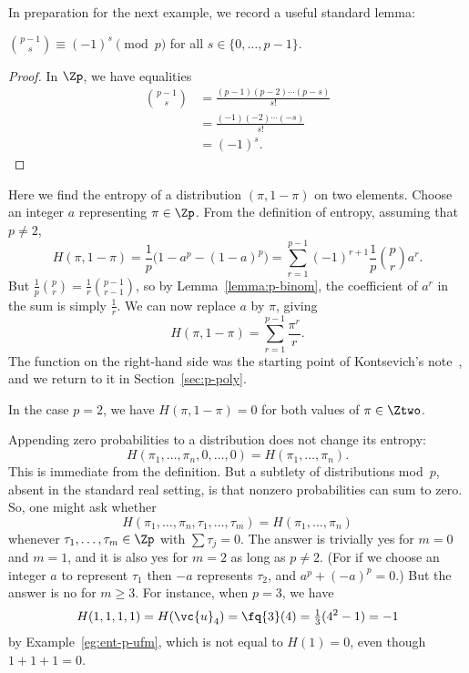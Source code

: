 In preparation for the next example, we record a useful standard lemma:

\begin{lemma}
$\binom{p - 1}{s} \equiv (-1)^s \pmod{p}$ for all $s \in \{0, \ldots, p -
  1\}$. 
\end{lemma}

\begin{proof}
In $\Zp$, we have equalities
% 
\begin{align*}
\binom{p - 1}{s}        &
=
\frac{(p - 1)(p - 2) \cdots (p - s)}{s!}    \\
&
=
\frac{(-1)(-2) \cdots (-s)}{s!}   \\
&
=
(-1)^s.
\end{align*}
% 
\end{proof}

\begin{example}
 Here we find the entropy of a distribution $(\pi, 1 - \pi)$
on two elements.  Choose an integer $a$ representing $\pi \in \Zp$.  From the
definition of entropy, assuming that $p \neq 2$,
\[
H(\pi, 1 - \pi)
=
\frac{1}{p} \bigl( 1 - a^p - (1 - a)^p \bigr)
=
\sum_{r = 1}^{p - 1} (-1)^{r + 1} \frac{1}{p} \binom{p}{r} a^r.
\]
But $\tfrac{1}{p} \binom{p}{r} = \tfrac{1}{r} \binom{p - 1}{r - 1}$, so by
Lemma~\ref{lemma:p-binom}, the coefficient of $a^r$ in the sum is simply
$\tfrac{1}{r}$.  We can now replace $a$ by $\pi$, giving
\[
H(\pi, 1 - \pi) = \sum_{r = 1}^{p - 1} \frac{\pi^r}{r}.
\]
The function on the right-hand side was the starting point of Kontsevich's
note~\cite{KontOHL}, and we return to it in Section~\ref{sec:p-poly}.  

In the case $p = 2$, we have $H(\pi, 1 - \pi) = 0$ for both values of $\pi
\in \Ztwo$.
\end{example}

\begin{example}
Appending zero probabilities to a distribution does not change its entropy:
\[
H(\pi_1, \ldots, \pi_n, 0, \ldots, 0) = H(\pi_1, \ldots, \pi_n).
\]
This is immediate from the definition.  But a subtlety of distributions
mod~$p$, absent in the standard real setting, is that nonzero
probabilities can sum to zero.  So, one might ask whether
\[
H(\pi_1, \ldots, \pi_n, \tau_1, \ldots, \tau_m) = H(\pi_1, \ldots, \pi_n)
\]
whenever $\tau_1, \ldots, \tau_m \in \Zp$ with $\sum \tau_j = 0$.  The
answer is trivially yes for $m = 0$ and $m = 1$, and it is also yes for $m
= 2$ as long as $p \neq 2$.  (For if we choose an integer $a$ to represent
$\tau_1$ then $-a$ represents $\tau_2$, and $a^p + (-a)^p = 0$.)  But the
answer is no for $m \geq 3$.  For instance, when $p = 3$, we have
\[
H(1, 1, 1, 1) = H(\vc{u}_4) = \fq{3}(4) = \tfrac{1}{3}(4^2 - 1) = -1
\]
by Example~\ref{eg:ent-p-ufm}, which is not equal to $H(1) = 0$, even
though $1 + 1 + 1 = 0$.
\end{example}


